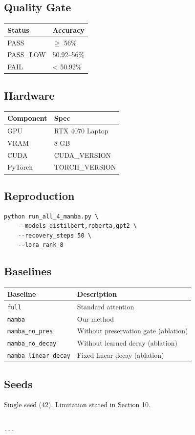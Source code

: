 \subsection{Quality Gate}

\begin{table}[H]
\centering
\small
\begin{tabular}{ll}
\toprule
\textbf{Status} & \textbf{Accuracy} \\
\midrule
PASS & $\ge$ 56\% \\
PASS\_LOW & 50.92--56\% \\
FAIL & < 50.92\% \\
\bottomrule
\end{tabular}
\end{table}

\subsection{Hardware}

\begin{table}[H]
\centering
\small
\begin{tabular}{ll}
\toprule
\textbf{Component} & \textbf{Spec} \\
\midrule
GPU & RTX 4070 Laptop \\
VRAM & 8 GB \\
CUDA & {{CUDA\_VERSION}} \\
PyTorch & {{TORCH\_VERSION}} \\
\bottomrule
\end{tabular}
\end{table}

\subsection{Reproduction}

\begin{lstlisting}
python run_all_4_mamba.py \
    --models distilbert,roberta,gpt2 \
    --recovery_steps 50 \
    --lora_rank 8
\end{lstlisting}

\subsection{Baselines}

\begin{table}[H]
\centering
\small
\begin{tabular}{ll}
\toprule
\textbf{Baseline} & \textbf{Description} \\
\midrule
\texttt{full} & Standard attention \\
\texttt{mamba} & Our method \\
\texttt{mamba\_no\_pres} & Without preservation gate (ablation) \\
\texttt{mamba\_no\_decay} & Without learned decay (ablation) \\
\texttt{mamba\_linear\_decay} & Fixed linear decay (ablation) \\
\bottomrule
\end{tabular}
\end{table}

\subsection{Seeds}

Single seed (42). Limitation stated in Section 10.
\begin{lstlisting}

---
\end{lstlisting}